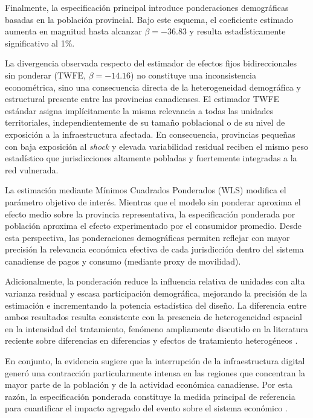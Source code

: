 Finalmente, la especificaci\'on principal introduce ponderaciones demogr\'aficas basadas en la poblaci\'on provincial. Bajo este esquema, el coeficiente estimado aumenta en magnitud hasta alcanzar $\beta = -36.83$ y resulta estad\'isticamente significativo al 1\%.

La divergencia observada respecto del estimador de efectos fijos bidireccionales sin ponderar ($\text{TWFE}$, $\beta = -14.16$) no constituye una inconsistencia econom\'etrica, sino una consecuencia directa de la heterogeneidad demogr\'afica y estructural presente entre las provincias canadienses. El estimador TWFE est\'andar asigna impl\'icitamente la misma relevancia a todas las unidades territoriales, independientemente de su tama\~no poblacional o de su nivel de exposici\'on a la infraestructura afectada. En consecuencia, provincias peque\~nas con baja exposici\'on al \textit{shock} y elevada variabilidad residual reciben el mismo peso estad\'istico que jurisdicciones altamente pobladas y fuertemente integradas a la red vulnerada.

La estimaci\'on mediante M\'inimos Cuadrados Ponderados (WLS) modifica el par\'ametro objetivo de inter\'es. Mientras que el modelo sin ponderar aproxima el efecto medio sobre la provincia representativa, la especificaci\'on ponderada por poblaci\'on aproxima el efecto experimentado por el consumidor promedio. Desde esta perspectiva, las ponderaciones demogr\'aficas permiten reflejar con mayor precisi\'on la relevancia econ\'omica efectiva de cada jurisdicci\'on dentro del sistema canadiense de pagos y consumo (mediante proxy de movilidad).

Adicionalmente, la ponderaci\'on reduce la influencia relativa de unidades con alta varianza residual y escasa participaci\'on demogr\'afica, mejorando la precisi\'on de la estimaci\'on e incrementando la potencia estad\'istica del dise\~no. La diferencia entre ambos resultados resulta consistente con la presencia de heterogeneidad espacial en la intensidad del tratamiento, fen\'omeno ampliamente discutido en la literatura reciente sobre diferencias en diferencias y efectos de tratamiento heterog\'eneos \citep{baker2026difference, callaway2024continuous, callaway2021difference, goodman2021difference}.

En conjunto, la evidencia sugiere que la interrupci\'on de la infraestructura digital gener\'o una contracci\'on particularmente intensa en las regiones que concentran la mayor parte de la poblaci\'on y de la actividad econ\'omica canadiense. Por esta raz\'on, la especificaci\'on ponderada constituye la medida principal de referencia para cuantificar el impacto agregado del evento sobre el sistema econ\'omico \citep{cameron2006robust, angrist2009mostly}.

